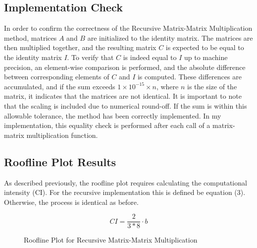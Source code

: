 \documentclass{article}
\begin{document}
\subsection{Implementation Check}
In order to confirm the correctness of the Recursive Matrix-Matrix Multiplication method, matrices \( A \) and \( B \) are initialized to the identity matrix. The matrices are then multiplied together, and the resulting matrix \( C \) is expected to be equal to the identity matrix \( I \). To verify that \( C \) is indeed equal to \( I \) up to machine precision, an element-wise comparison is performed, and the absolute difference between corresponding elements of \( C \) and \( I \) is computed. These differences are accumulated, and if the sum exceeds \( 1 \times 10^{-15} \times n \), where \( n \) is the size of the matrix, it indicates that the matrices are not identical. It is important to note that the scaling is included due to numerical round-off. If the sum is within this allowable tolerance, the method has been correctly implemented. In my implementation, this equality check is performed after each call of a matrix-matrix multiplication function.

\subsection{Roofline Plot Results}

As described previously, the roofline plot requires calculating the computational intensity (CI). For the recursive implementation this is defined be equation (3). Otherwise, the process is identical as before. 

\begin{equation}
CI = \frac{2}{3 * 8} \cdot b 
\end{equation}

\clearpage

\begin{figure}[!htb]
    \centering
    \caption{Roofline Plot for Recursive Matrix-Matrix Multiplication}
\end{figure}
\end{document}
